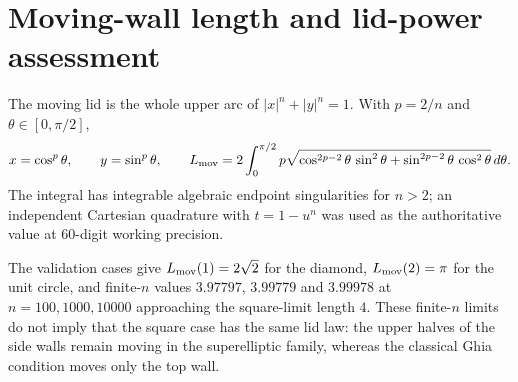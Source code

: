 \documentclass[11pt]{article}
\newcommand{\tabbox}[1]{\resizebox{\ifdim\width>\textwidth\textwidth\else\width\fi}{!}{#1}}
\begin{document}
\section{Moving-wall length and lid-power assessment}
\label{sec:lidpower}

The moving lid is the whole upper arc of $|x|^n+|y|^n=1$. With $p=2/n$ and
$\theta\in[0,\pi/2]$,
\begin{equation}
  x=\cos^p\theta,\qquad y=\sin^p\theta,\qquad
  L_{\rm mov}=2\int_0^{\pi/2}
  p\sqrt{\cos^{2p-2}\theta\,\sin^2\theta+
        \sin^{2p-2}\theta\,\cos^2\theta}\,d\theta .
  \label{eq:lmov}
\end{equation}
The integral has integrable algebraic endpoint singularities for $n>2$;
an independent Cartesian quadrature with $t=1-u^n$ was used as the
authoritative value at $60$-digit working precision.

\begin{table}[H]
\centering
\caption{Upper-half moving-wall arclength for $L_c=2$. The $n=2$ value is
$\pi$; the diamond and square limits are validated separately below.}




\label{tab:lmov}
\tabbox{}
\end{table}
\par

The validation cases give $L_{\rm mov}(1)=2\sqrt2$ for the diamond,
$L_{\rm mov}(2)=\pi$ for the unit circle, and finite-$n$ values
$3.97797$, $3.99779$ and $3.99978$ at $n=100,1000,10000$ approaching the
square-limit length $4$. These finite-$n$ limits do not imply that the square
case has the same lid law: the upper halves of the side walls remain moving in
the superelliptic family, whereas the classical Ghia condition moves only the
top wall.
\end{document}
